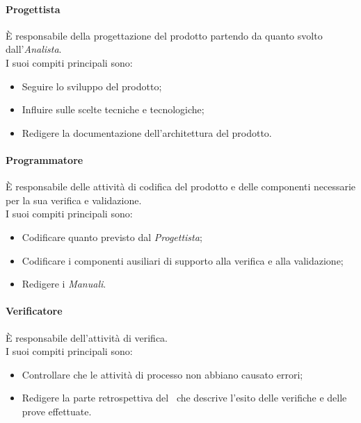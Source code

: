 \paragraph*{Progettista}
È responsabile della progettazione del prodotto partendo da quanto svolto dall'\textit{Analista}.\\
I suoi compiti principali sono:
\begin{itemize}
	\item Seguire lo sviluppo del prodotto;
	\item Influire sulle scelte tecniche e tecnologiche;
	\item Redigere la documentazione dell'architettura del prodotto.
\end{itemize}

\paragraph*{Programmatore}
È responsabile delle attività di codifica del prodotto e delle componenti necessarie per la sua verifica e validazione.\\
I suoi compiti principali sono:
\begin{itemize}
	\item Codificare quanto previsto dal \textit{Progettista};
	\item Codificare i componenti ausiliari di supporto alla verifica e alla validazione;
	\item Redigere i \textit{Manuali}.
\end{itemize}

\paragraph*{Verificatore}
È responsabile dell'attività di verifica.\\
I suoi compiti principali sono:
\begin{itemize}
	\item Controllare che le attività di processo non abbiano causato errori;
	\item Redigere la parte retrospettiva del \PdQv\ che descrive l'esito delle verifiche e delle prove effettuate.
\end{itemize}

